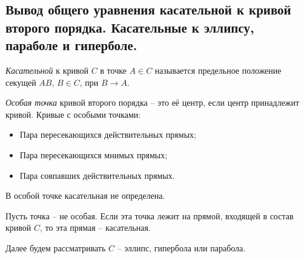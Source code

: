 \subsection{Вывод общего уравнения касательной к кривой второго порядка. Касательные к эллипсу, параболе и гиперболе.}
    
    \begin{definition}
    	\textit{Касательной} к кривой $C$ в точке $A \in C$ называется предельное положение секущей $AB$, $B \in C$, при $B \to A$.
    \end{definition}

    \begin{definition}
        \textit{Особая точка} кривой второго порядка -- это её центр, если центр принадлежит кривой. Кривые с особыми точками:
        \begin{itemize}
            \item Пара пересекающихся действительных прямых;
            \item Пара пересекающихся мнимых прямых;
            \item Пара совпавших действительных прямых.
        \end{itemize}
    \end{definition}

    \begin{note}
        В особой точке касательная не определена.
    \end{note}

    \begin{note}
        Пусть точка -- не особая. Если эта точка лежит на прямой, входящей в состав кривой $C$, то эта прямая -- касательная. 
    \end{note}

    Далее будем рассматривать $C$ -- эллипс, гипербола или парабола.\\
    

